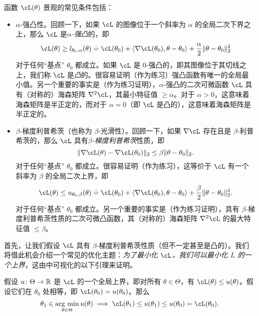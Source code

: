 \documentclass[../../book-main_zh.tex]{subfiles}
\begin{document}
函数 \(\cL(\theta)\) 景观的常见条件包括：
\begin{itemize}
    \item \(\alpha\)-强凸性。回顾一下，如果 \(\cL\) 的图像位于一个斜率为 \(\alpha\) 的全局二次下界之上，那么 \(\cL\) 是\textit{\(\alpha\)-强凸}的，即
    \begin{equation}
        \cL(\theta) \geq l_{\theta_{0}, \alpha}(\theta) \doteq \cL(\theta_{0}) + \ip{\nabla \cL(\theta_{0})}{\theta - \theta_{0}} + \frac{\alpha}{2}\norm{\theta - \theta_{0}}_{2}^{2}
    \end{equation}
    对于任何“基点” \(\theta_{0}\) 都成立。如果 \(\cL\) 是 \(0\)-强凸的，即其图像位于其切线之上，我们称 \(\cL\) 是\textit{凸}的。很容易证明（作为练习）强凸函数有唯一的全局最小值。另一个重要的事实是（作为练习证明），\(\alpha\)-强凸的二次可微函数 \(\cL\) 具有（对称的）海森矩阵 \(\nabla^{2}\cL\)，其最小特征值 \(\geq \alpha\)。对于 \(\alpha > 0\)，这意味着海森矩阵是半正定的，而对于 \(\alpha = 0\)（即 \(\cL\) 是凸的），这意味着海森矩阵是半正定的。
    \item \(\beta\)-梯度利普希茨（也称为 \(\beta\)-光滑性）。回顾一下，如果 \(\nabla \cL\) 存在且是 \(\beta\)-利普希茨的，那么 \(\cL\) 具有\textit{\(\beta\)-梯度利普希茨}性质，即
    \begin{equation}
        \norm{\nabla \cL(\theta) - \nabla \cL(\theta_{0})}_{2} \leq \beta \norm{\theta - \theta_{0}}_{2}.
    \end{equation}
    对于任何“基点” \(\theta_{0}\) 都成立。很容易证明（作为练习），这等价于 \(\cL\) 有一个斜率为 \(\beta\) 的全局二次上界，即
    \begin{equation}
        \cL(\theta) \leq u_{\theta_{0}, \beta}(\theta) \doteq \cL(\theta_{0}) + \ip{\nabla \cL(\theta_{0})}{\theta - \theta_{0}} + \frac{\beta}{2}\norm{\theta - \theta_{0}}_{2}^{2}.
    \end{equation}
    对于任何“基点” \(\theta_{0}\) 都成立。另一个重要的事实是（作为练习证明），具有 \(\beta\)-梯度利普希茨性质的二次可微凸函数，其（对称的）海森矩阵 \(\nabla^{2}\cL\) 的最大特征值 \(\leq \beta\)。
\end{itemize}
首先，让我们假设 \(\cL\) 具有 \(\beta\)-梯度利普希茨性质（但不一定甚至是凸的）。我们将借此机会介绍一个常见的优化主题：\textit{为了最小化 \(\cL\)，我们可以最小化 \(L\) 的一个上界}，这由中可视化的以下引理来证明。
\begin{lemma}[主化-最小化]\label{lem:majorization_minimization}
    假设 \(u \colon \Theta \to \mathbb{R}\) 是 \(\cL\) 的一个全局上界，即对所有 \(\theta \in \Theta\)，有 \(\cL(\theta) \leq u(\theta)\)。假设它们在 \(\theta_{0}\) 处相等，即 \(\cL(\theta_{0}) = u(\theta_{0})\)。那么
    \begin{equation}
        \theta_{1} \in \argmin_{\theta \in \Theta}u(\theta) \implies \cL(\theta_{1}) \leq u(\theta_{1}) \leq u(\theta_{0}) = \cL(\theta_{0}).
    \end{equation}
\end{lemma}
\end{document}
